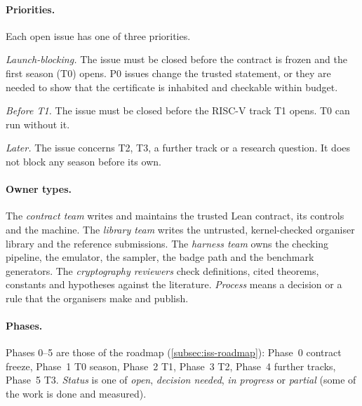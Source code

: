 \paragraph{Priorities.} Each open issue has one of three priorities.
\begin{description}[nosep,leftmargin=2.6em,labelwidth=2em,font=\normalfont\bfseries]
\item[P0] \emph{Launch-blocking.} The issue must be closed before the contract is frozen and the
  first season (T0) opens. P0 issues change the trusted statement, or they are needed to show that
  the certificate is inhabited and checkable within budget.
\item[P1] \emph{Before T1.} The issue must be closed before the RISC-V track T1 opens. T0 can run
  without it.
\item[P2] \emph{Later.} The issue concerns T2, T3, a further track or a research question. It does
  not block any season before its own.
\end{description}

\paragraph{Owner types.} The \emph{contract team} writes and maintains the trusted Lean contract,
its controls and the machine. The \emph{library team} writes the untrusted, kernel-checked
organiser library and the reference submissions. The \emph{harness team} owns the checking
pipeline, the emulator, the sampler, the badge path and the benchmark generators. The
\emph{cryptography reviewers} check definitions, cited theorems, constants and hypotheses against
the literature. \emph{Process} means a decision or a rule that the organisers make and publish.

\paragraph{Phases.} Phases 0--5 are those of the roadmap (\cref{subsec:iss-roadmap}): Phase~0
contract freeze, Phase~1 T0 season, Phase~2 T1, Phase~3 T2, Phase~4 further tracks, Phase~5 T3.
\emph{Status} is one of \emph{open}, \emph{decision needed}, \emph{in progress} or \emph{partial}
(some of the work is done and measured).

